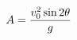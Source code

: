 \documentclass[preview]{standalone}
\begin{document}
\begin{align*}
\special{dvisvgm:raw <g id='unique000'>}A = {v_0^2 \sin 2\theta \over g}\special{dvisvgm:raw </g>}
\end{align*}
\end{document}
